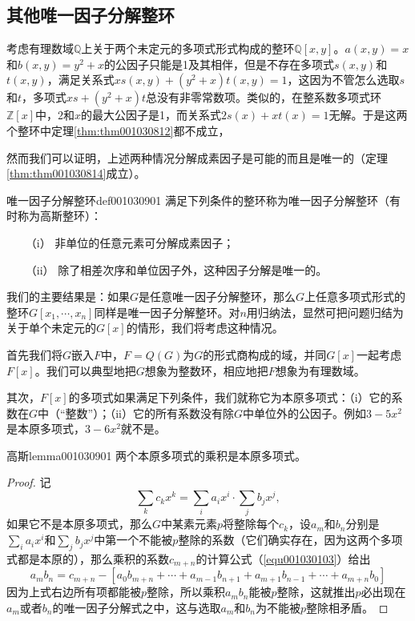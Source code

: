 \subsection{其他唯一因子分解整环}\label{subsection0010309}
考虑有理数域$\mathbb{Q}$上关于两个未定元的多项式形式构成的整环$\mathbb{Q}[x, y]$。$a(x,y) = x$和$b(x,y)=y^2+x$的公因子只能是1及其相伴，但是不存在多项式$s(x,y)$和$t(x,y)$，满足关系式$xs(x,y)+(y^2+x)t(x,y)=1$，这因为不管怎么选取$s$和$t$，多项式$xs+(y^2+x)t$总没有非零常数项。类似的，在整系数多项式环$\mathbb{Z}[x]$中，$2$和$x$的最大公因子是1，而关系式$2s(x)+xt(x)=1$无解。于是这两个整环中定理\ref{thm:thm001030812}都不成立，

然而我们可以证明，上述两种情况分解成素因子是可能的而且是唯一的（定理\ref{thm:thm001030814}成立）。
\begin{definition}{唯一因子分解整环}{def001030901}
满足下列条件的整环称为唯一因子分解整环（有时称为高斯整环）：
\begin{enumerate}
\item[（i）] 非单位的任意元素可分解成素因子；
\item[（ii）] 除了相差次序和单位因子外，这种因子分解是唯一的。
\end{enumerate}
\end{definition}

我们的主要结果是：如果$G$是任意唯一因子分解整环，那么$G$上任意多项式形式的整环$G[x_1, \cdots, x_n]$同样是唯一因子分解整环。对$n$用归纳法，显然可把问题归结为关于单个未定元的$G[x]$的情形，我们将考虑这种情况。

首先我们将$G$嵌入$F$中，$F=Q(G)$为$G$的形式商构成的域，并同$G[x]$一起考虑$F[x]$。我们可以典型地把$G$想象为整数环，相应地把$F$想象为有理数域。

其次，$F[x]$的多项式如果满足下列条件，我们就称它为本原多项式：（i）它的系数在$G$中（“整数”）；（ii）它的所有系数没有除$G$中单位外的公因子。例如$3-5x^2$是本原多项式，$3-6x^2$就不是。

\begin{lemma}{高斯}{lemma001030901}
两个本原多项式的乘积是本原多项式。
\end{lemma}

\begin{proof}
记
\[
\sum_{k}{c_kx^k} = \sum_{i}{a_ix^i} \cdot \sum_{j}{b_jx^j},
\]
如果它不是本原多项式，那么$G$中某素元素$p$将整除每个$c_k$，设$a_m$和$b_n$分别是$\sum_{i}{a_ix^i}$和$\sum_{j}{b_jx^j}$中第一个不能被$p$整除的系数（它们确实存在，因为这两个多项式都是本原的），那么乘积的系数$c_{m+n}$的计算公式（\ref{equ001030103}）给出
\[
a_mb_n=c_{m+n} - [a_0b_{m+n} + \cdots+a_{m-1}b_{n+1} + a_{m+1}b_{n-1} + \cdots+a_{m+n}b_0]
\]
因为上式右边所有项都能被$p$整除，所以乘积$a_mb_n$能被$p$整除，这就推出$p$必出现在$a_m$或者$b_n$的唯一因子分解式之中，这与选取$a_m$和$b_n$为不能被$p$整除相矛盾。
\end{proof}


